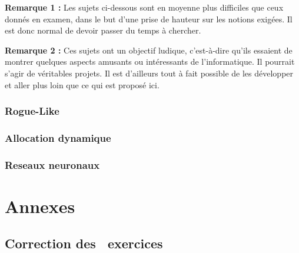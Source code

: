 \documentclass{minitelreport}
\newcounter{exercisescounter}
\begin{document}
\begin{refsection}
		\textbf{Remarque 1 :} Les sujets ci-dessous sont en moyenne plus difficiles que ceux donnés en examen, dans le but d'une prise de hauteur sur les notions exigées. Il est donc normal de devoir passer du temps à chercher.

		\textbf{Remarque 2 :} Ces sujets ont un objectif ludique, c'est-à-dire qu'ils essaient de montrer quelques aspects amusants ou intéressants de l'informatique. Il pourrait s'agir de véritables projets. Il est d'ailleurs tout à fait possible de les développer et aller plus loin que ce qui est proposé ici.
		\section{Rogue-Like}
			
		\section{Allocation dynamique}
			
		\section{Reseaux neuronaux}
			
\part{Annexes}
\chapter{Correction des \theexercisescounter\ exercices}
	
\printbibheading
\printbibliography[type=book,heading=subbibliography,title={Livres}]
\printbibliography[type=manual, heading=subbibliography, title={Manuels et documentation}]
\printbibliography[type=online, heading=subbibliography, title={Autres liens}]
\end{refsection}
\end{document}
